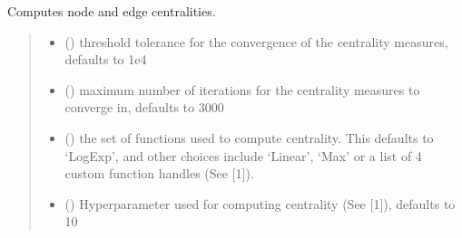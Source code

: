 \documentclass[letterpaper,10pt,english]{sphinxmanual}
\begin{document}
\begin{fulllineitems}
\begin{fulllineitems}
\end{fulllineitems}


\begin{fulllineitems}
\label{\detokenize{HAT:HAT.Hypergraph.Hypergraph.centrality}}
\pysigstartsignatures
{}
\pysigstopsignatures
\sphinxAtStartPar
Computes node and edge centralities.
\begin{quote}\begin{description}
\begin{itemize}
\item {} 
\sphinxAtStartPar
{} (\sphinxstyleliteralemphasis{\sphinxupquote{, }}) \textendash{} threshold tolerance for the convergence of the centrality measures, defaults to 1e\sphinxhyphen{}4

\item {} 
\sphinxAtStartPar
{} (\sphinxstyleliteralemphasis{\sphinxupquote{, }}) \textendash{} maximum number of iterations for the centrality measures to converge in, defaults to 3000

\item {} 
\sphinxAtStartPar
{} (\sphinxstyleliteralemphasis{\sphinxupquote{, }}) \textendash{} the set of functions used to compute centrality. This defaults to ‘LogExp’, and other choices include
‘Linear’, ‘Max’ or a list of 4 custom function handles (See {[}1{]}).

\item {} 
\sphinxAtStartPar
{} (\sphinxstyleliteralemphasis{\sphinxupquote{, }}) \textendash{} Hyperparameter used for computing centrality (See {[}1{]}), defaults to 10


\end{itemize}
\end{description}
\end{quote}
\end{fulllineitems}
\end{fulllineitems}
\end{document}

